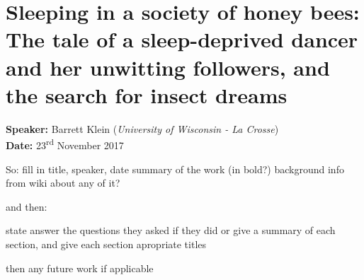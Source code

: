 \section{Sleeping in a society of honey bees: The tale of a sleep-deprived dancer and her unwitting followers, and the search for insect dreams}

\textbf{Speaker:} Barrett Klein (\textit{University of Wisconsin - La Crosse})\\
\textbf{Date:} \hspace{.53cm} 23\textsuperscript{rd} November 2017
\vspace{.5cm}


So:
fill in title, speaker, date
summary of the work (in bold?)
background info from wiki about any of it?

and then:

state answer the questions they asked if they did
or give a summary of each section, and give each section apropriate titles

then any future work if applicable